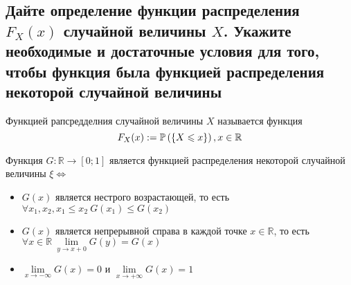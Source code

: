 \documentclass{article}
\begin{document}



\subsection{Дайте определение функции распределения $F_X (x)$ случайной величины $X$. Укажите необходимые и достаточные условия для того, чтобы функция была функцией распределения некоторой случайной величины}
 Функцией рапсредделния случайной величины $X$ называется функция 
\begin{equation*}
    F_X(x):=\mathbb{P}\left(\{X\leqslant x\}\right),x\in\mathbb{R}
\end{equation*}

\theorem Функция $G:\mathbb{R}\to[0;1]$ является функцией распределения некоторой случайной величины $\xi\Longleftrightarrow$
\begin{itemize}
    \item $G(x)$ является нестрого возрастающей, то есть $\forall x_1,x_2, x_1\leqslant x_2\ G(x_1)\leqslant G(x_2)$
    \item $G(x)$ является непрерывной справа в каждой точке $x\in\mathbb{R}$, то есть $\forall x\in\mathbb{R}\ \lim\limits_{y\to x+0} G(y)=G(x)$
    \item $\lim\limits_{x\to-\infty} G(x)=0$ и $\lim\limits_{x\to+\infty} G(x)=1$
\end{itemize}
\end{document}

